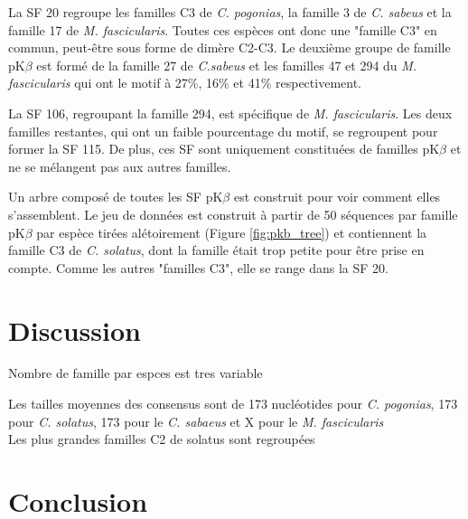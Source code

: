 \documentclass[12pt,a4paper]{article}
\begin{document}
	La SF 20 regroupe les familles C3 de \textit{C. pogonias}, la famille 3 de \textit{C. sabeus} et la famille 17 de \textit{M. fascicularis}. Toutes ces espèces ont donc une "famille C3" en commun, peut-être sous forme de dimère C2-C3. Le deuxième groupe de famille pK$\beta$ est formé de la famille 27 de  \textit{C.sabeus} et les familles  47 et 294 du \textit{M. fascicularis} qui ont le motif à 27\%, 16\% et 41\% respectivement. 
	
	La SF 106, regroupant la famille 294, est spécifique de \textit{M. fascicularis}. Les deux familles restantes, qui ont un faible pourcentage du motif, se regroupent pour former la SF 115. De plus, ces SF sont uniquement constituées de familles pK$\beta$ et ne se mélangent pas aux autres familles.
	
	Un arbre composé de toutes les SF pK$\beta$ est construit pour voir comment elles s'assemblent. Le jeu de données est construit à partir de 50 séquences par famille pK$\beta$ par espèce tirées alétoirement (Figure \ref{fig:pkb_tree}) et contiennent la famille C3 de \textit{C. solatus}, dont la famille était trop petite pour être prise en compte. Comme les autres "familles C3", elle se range dans la SF 20. 

\section{Discussion}

	Nombre de famille par espces est tres variable

	Les tailles moyennes des consensus sont de 173 nucléotides pour \textit{C. pogonias}, 173 pour \textit{C. solatus}, 173 pour le \textit{C. sabaeus} et X pour le \textit{M. fascicularis}\\
	
	Les plus grandes familles C2 de solatus sont regroupées\\


\section{Conclusion}


\newpage
\strut  ~  \mbox{}  \null
\newpage
  
\end{document}
